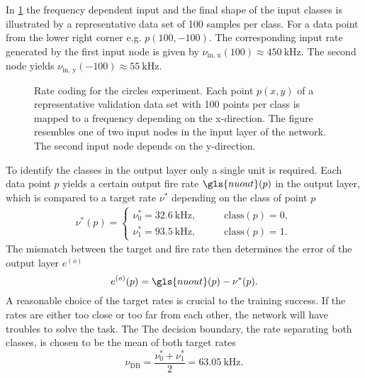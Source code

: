 In \cref{circlesinputs} the frequency dependent input and the final shape of the input classes is illustrated by a representative data set of 100 samples per class. For a data point from the lower right corner e.g. $p(100,-100)$. The corresponding input rate generated by the first input node is given by $\nu_{\text{in, x}}(100) \approx \SI{450}{\kilo \Hz}$. The second node yields $\nu_{\text{in, y}}(-100) \approx \SI{55}{\kilo \Hz}$.
\begin{figure}[htb!]
	\begin{subfigure}[c]{0.5\textwidth}
		\centering
	\end{subfigure}
	\begin{subfigure}[c]{0.5\textwidth}
		\centering
	\end{subfigure}
	\caption[Rate coding for the circles experiment.]{Rate coding for the circles experiment. Each point $p(x,y)$ of a representative validation data set with 100 points per class is mapped to a frequency depending on the x-direction. The figure resembles one of two input nodes in the input layer of the network. The second input node depends on the y-direction.}
	\label{circlesinputs}
\end{figure}
To identify the classes in the output layer only a single unit is required. Each data point $p$ yields a certain output fire rate $\gls{nuout}(p)$ in the output layer, which is compared to a target rate $\nu^*$ depending on the class of point $p$
\begin{align}
\nu^*(p) =
\begin{cases}
\nu_0^* = \SI{32.6}{\kilo \Hz} ,&\quad \quad \text{class}(p) = 0,\\
\nu_1^* = \SI{93.5}{\kilo \Hz} ,&\quad \quad \text{class}(p) = 1.
\end{cases}
\label{circlestarget}
\end{align}
The mismatch between the target and fire rate then determines the error of the output layer $e^{(o)}$
\begin{equation*}
e^{(o)}(p) = \gls{nuout}(p) - \nu^*(p).
\label{circleserror}
\end{equation*}
A reasonable choice of the target rates is crucial to the training success. If the rates are either too close or too far from each other, the network will have troubles to solve the task. The The decision boundary, the rate separating both classes, is chosen to be the mean of both target rates
\begin{equation*}
\nu_\text{DB} = \frac{\nu_0^* + \nu_1^*}{2} = \SI{63.05}{\kilo \Hz}.
\label{circlesdb}
\end{equation*}


